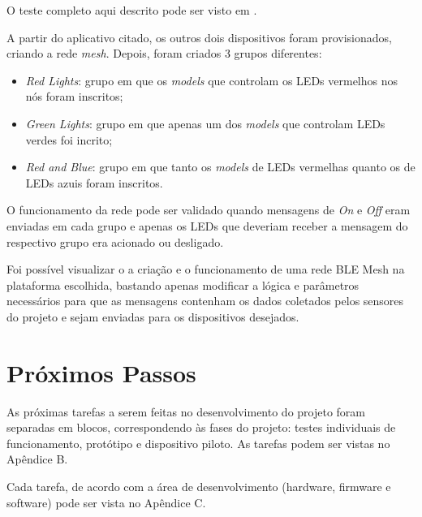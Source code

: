 \documentclass[../monografia.tex]{subfiles}
\begin{document}
O teste completo aqui descrito pode ser visto em \cite{teste-ble-mesh}.

A partir do aplicativo citado, os outros dois dispositivos foram provisionados, criando a rede \textit{mesh}. Depois, foram criados 3 grupos diferentes:

\begin{itemize}
	\item \textit{Red Lights}: grupo em que os \textit{models} que controlam os LEDs vermelhos nos nós foram inscritos;
	\item \textit{Green Lights}: grupo em que apenas um dos \textit{models} que controlam LEDs verdes foi incrito;
	\item \textit{Red and Blue}: grupo em que tanto os \textit{models} de LEDs vermelhas quanto os de LEDs azuis foram inscritos.
\end{itemize}

O funcionamento da rede pode ser validado quando mensagens de \textit{On} e \textit{Off} eram enviadas em cada grupo e apenas os LEDs que deveriam receber a mensagem do respectivo grupo era acionado ou desligado.

Foi possível visualizar o a criação e o funcionamento de uma rede BLE Mesh na plataforma escolhida, bastando apenas modificar a lógica e parâmetros necessários para que as mensagens contenham os dados coletados pelos sensores do projeto e sejam enviadas para os dispositivos desejados.

\section{Próximos Passos}

As próximas tarefas a serem feitas no desenvolvimento do projeto foram separadas em blocos, correspondendo às fases do projeto: testes individuais de funcionamento, protótipo e dispositivo piloto. 
As tarefas podem ser vistas no Apêndice B. 

Cada tarefa, de acordo com a área de desenvolvimento (hardware, firmware e software) pode ser vista no Apêndice C. 
\end{document}
